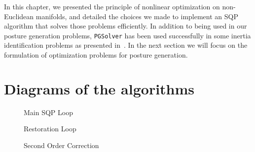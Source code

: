 In this chapter, we presented the principle of nonlinear optimization on non-Euclidean manifolds, and detailed the choices we made to implement an SQP algorithm that solves those problems efficiently.
In addition to being used in our posture generation problems, {\tt PGSolver} has been used successfully in some inertia identification problems as presented in~\cite{traversaro:iros:2016}.
In the next section we will focus on the formulation of optimization problems for posture generation.

\section{Diagrams of the algorithms}
\label{sec:diagrams_of_the_algorithms}

\begin{figure}[htpb]
  \centering
  
  \caption{Main SQP Loop}
\label{fig:main_sqp_loop}
\end{figure}

\begin{figure}[htpb]
  \begin{minipage}{.5\textwidth}
    \centering
    
    \caption{Restoration Loop}
\label{fig:restoration_loop}
  \end{minipage}%
  \begin{minipage}{.5\textwidth}
    \centering
    
    \caption{Second Order Correction}
\label{fig:second_order_correction}
  \end{minipage}%
\end{figure}


